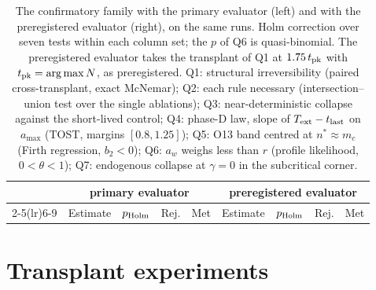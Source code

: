 \documentclass[pre,onecolumn,superscriptaddress,notitlepage]{revtex4-2}
\begin{document}
\begin{table}[ht]
\centering
\caption{The confirmatory family with the primary evaluator (left) and with the preregistered evaluator (right), on
the same runs. Holm correction over seven tests within each column set; the $p$ of Q6 is quasi-binomial. The
preregistered evaluator takes the transplant of Q1 at $1.75\,t_{\rm pk}$ with $t_{\rm pk}=\arg\max N$, as
preregistered. Q1: structural irreversibility (paired cross-transplant, exact McNemar); Q2: each rule necessary
(intersection--union test over the single ablations); Q3: near-deterministic collapse against the short-lived control; Q4:
phase-D law, slope of $T_{\rm ext}-t_{\rm last}$ on $a_{\max}$ (TOST, margins $[0.8,1.25]$); Q5: O13 band centred
at $n^*\approx m_c$ (Firth regression, $b_2<0$); Q6: $a_w$ weighs less than $r$ (profile likelihood, $0<\theta<1$);
Q7: endogenous collapse at $\gamma=0$ in the subcritical corner.}
\label{tab:res-Qcmp}
\scriptsize
\setlength{\tabcolsep}{3pt}
\begin{tabular}{@{}lp{4.6cm}lccp{4.6cm}lcc@{}}
\toprule
& \multicolumn{4}{c}{primary evaluator} & \multicolumn{4}{c}{preregistered evaluator} \\
\cmidrule(lr){2-5}\cmidrule(lr){6-9}
& Estimate & $p_{\rm Holm}$ & Rej. & Met & Estimate & $p_{\rm Holm}$ & Rej. & Met \\
\midrule

\end{tabular}
\end{table}

\section{Transplant experiments}
\label{supp:transplant}
\end{document}
